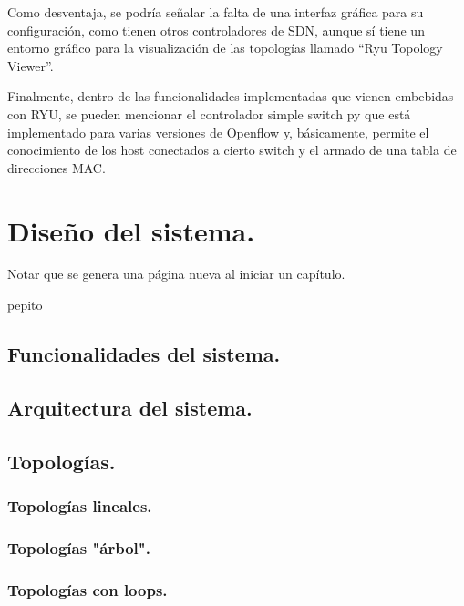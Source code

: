 \documentclass[12pt,a4paper,oneside]{book}
\begin{document}
Como desventaja, se podría señalar la falta de una interfaz gráfica para su configuración, como tienen otros controladores de SDN, aunque sí tiene un entorno gráfico para la visualización de las topologías llamado “Ryu Topology Viewer”.

\vspace{0.5cm}

Finalmente, dentro de las funcionalidades implementadas que vienen embebidas con RYU, se pueden mencionar el controlador simple switch py que está implementado para varias versiones de Openflow y, básicamente, permite el conocimiento de los host conectados a cierto switch y el armado de una tabla de direcciones MAC.


\chapter{Diseño del sistema.}

Notar que se genera una página nueva al iniciar un capítulo.

pepito

\section{Funcionalidades del sistema.}
\label{funcionalidades}



\section{Arquitectura del sistema.}
\label{arquitectura}


\section{Topologías.}
\label{topologias}

\subsection{Topologías lineales.}
\label{topos_lineales}
\subsection{Topologías "árbol".}
\label{topos_arbol}

\subsection{Topologías con loops.}
\label{topos_loops}
\end{document}
